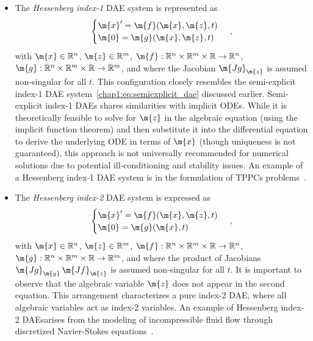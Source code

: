 \begin{itemize}
  \setlength\itemsep{0.0em}
  \item The \emph{Hessenberg index-1} \ac{DAE} system is represented as
  \begin{equation*}
    \begin{cases}
      \m{x}^{\prime} = \m{f}(\m{x}, \m{z}, t) \\
      \m{0} = \m{g}(\m{x}, \m{z}, t)
    \end{cases} \, \text{,}
  \end{equation*}
  with $\m{x} \in \mathbb{R}^n$, $\m{z} \in \mathbb{R}^m$, $\m{f}: \mathbb{R}^{n} \times \mathbb{R}^{m} \times \mathbb{R} \rightarrow \mathbb{R}^{n}$, $\m{g}: \mathbb{R}^{n} \times \mathbb{R}^{m} \times \mathbb{R} \rightarrow \mathbb{R}^{m}$, and where the Jacobian $\m{Jg}_\m{z}$ is assumed non-singular for all $t$. This configuration closely resembles the semi-explicit index-1 \ac{DAE} system~\eqref{chap1:eq:semiexplicit_dae} discussed earlier. Semi-explicit index-1 \acp{DAE} shares similarities with implicit \acp{ODE}. While it is theoretically feasible to solve for $\m{z}$ in the algebraic equation (using the implicit function theorem) and then substitute it into the differential equation to derive the underlying \ac{ODE} in terms of $\m{x}$ (though uniqueness is not guaranteed), this approach is not universally recommended for numerical solutions due to potential ill-conditioning and stability issues. An example of a Hessenberg index-1 \ac{DAE} system is in the formulation of \acp{TPPC} problems~\cite{brenan1995numerical}.
  \item The \emph{Hessenberg index-2} \ac{DAE} system is expressed as
  \begin{equation*}
    \begin{cases}
      \m{x}^{\prime} = \m{f}(\m{x}, \m{z}, t) \\
      \m{0} = \m{g}(\m{x}, t)
    \end{cases} \, \text{,}
  \end{equation*}
  with $\m{x} \in \mathbb{R}^n$, $\m{z} \in \mathbb{R}^m$, $\m{f}: \mathbb{R}^{n} \times \mathbb{R}^{m} \times \mathbb{R} \rightarrow \mathbb{R}^{n}$, $\m{g}: \mathbb{R}^{n} \times \mathbb{R}^{m} \times \mathbb{R} \rightarrow \mathbb{R}^{m}$, and where the product of Jacobians $\m{Jg}_\m{y} \, \m{Jf}_\m{z}$ is assumed non-singular for all $t$. It is important to observe that the algebraic variable $\m{z}$ does not appear in the second equation. This arrangement characterizes a pure index-2 \ac{DAE}, where all algebraic variables act as index-2 variables. An example of Hessenberg index-2 \acp{DAE}arises from the modeling of incompressible fluid flow through discretized Navier-Stokes equations~\cite{ascher1998computer}.

\end{itemize}
